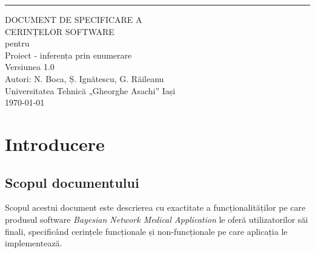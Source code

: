\documentclass{scrreprt}
\date{}
\def\myversion{1.0 }
\begin{document}
\begin{flushright}
    \rule{16cm}{5pt}\vskip1cm
    \begin{bfseries}
        \Huge{DOCUMENT DE SPECIFICARE A\\CERINȚELOR SOFTWARE}\\
        \vspace{1.7cm}
        pentru\\
        \vspace{1.7cm}
        Proiect - inferența prin enumerare\\
        \vspace{1.7cm}
        \LARGE{Versiunea \myversion}\\
        \vspace{1.7cm}
        Autori: N. Boca, Ș. Ignătescu, G. Răileanu\\
        \vspace{1.7cm}
        Universitatea Tehnică „Gheorghe Asachi” Iași\\
        \vspace{1.7cm}
        \today\\
    \end{bfseries}
\end{flushright}

\tableofcontents


\chapter{Introducere}

\section{Scopul documentului}
Scopul acestui document este descrierea cu exactitate a funcționalităților pe care produsul software \textit{Bayesian Network Medical Application} le oferă utilizatorilor săi finali, specificând cerințele funcționale și non-funcționale pe care aplicația le implementează.
\end{document}
